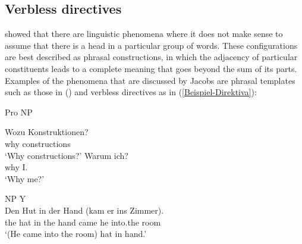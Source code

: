 \begin{exe}
\begin{xlist}[iv.]
\begin{exe}
\begin{xlist}[iv.]
\subsection{Verbless directives}
\label{Abschnitt-Phrasale-Konstruktionen-Jacobs}

\citet{Jacobs2008a} showed that there are linguistic phenomena where it does not make sense to assume that there is a head
in a particular group of words. These configurations are best described as phrasal constructions, in which the adjacency of particular
constituents leads to a complete meaning that goes beyond the sum of its parts. Examples of the
phenomena that are discussed by Jacobs are phrasal templates such as those in ()
and verbless directives as in (\ref{Beispiel-Direktiva}):
\begin{exe}
\ex Pro NP
\begin{xlist}
\ex
\gll  Wozu Konstruktionen?\\
      why constructions\\
\glt `Why constructions?'
\ex 
\gll Warum ich?\\
     why I.\nom\\
\glt `Why me?'
\end{xlist}
\end{exe}
\ea
NP Y\\
\gll Den Hut in der Hand (kam er ins Zimmer).\\
     the hat in the hand came he into.the room\\
\glt `(He came into the room) hat in hand.'


\end{xlist}
\end{exe}
\end{xlist}
\end{exe}
